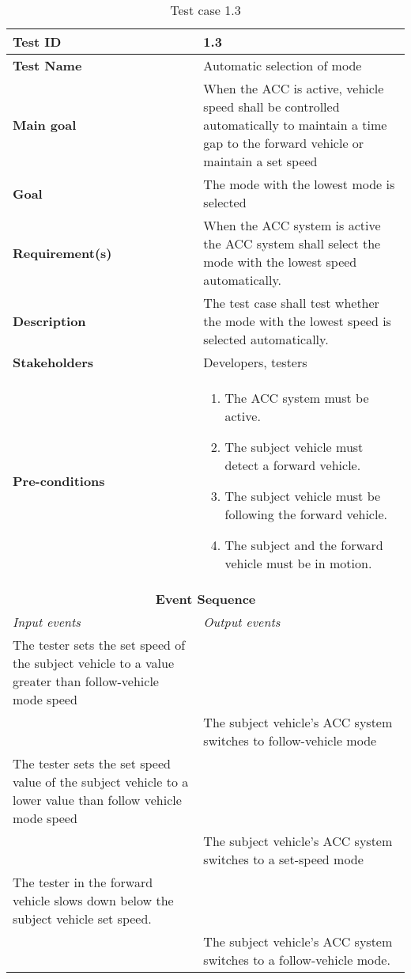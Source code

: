 \begin{table}[H]
\centering
\begin{tabularx}{\linewidth}{X|X}
  \hline
  \textbf{Test ID} & 1.3 \\
  \hline
  \textbf{Test Name} & Automatic selection of mode \\
  \hline
  \textbf{Main goal} & When the ACC is active, vehicle speed shall be controlled automatically to maintain a time gap to the forward vehicle or maintain a set speed  \\
  \hline
  \textbf{Goal} & The mode with the lowest mode is selected \\
  \hline
  \textbf{Requirement(s)} & When the ACC system is active the ACC system shall select the mode with the lowest speed automatically. \\
  \hline
  \textbf{Description} & The test case shall test whether the mode with the lowest speed is selected automatically.  \\
  \hline
  \textbf{Stakeholders} & Developers, testers \\
  \hline
  \textbf{Pre-conditions} & 
  \begin{enumerate}
      \item The ACC system must be active.
      \item The subject vehicle must detect a forward vehicle.
      \item The subject vehicle must be following the forward vehicle.
      \item The subject and the forward vehicle must be in motion. 
  \end{enumerate}
  \\
  \hline
  \multicolumn{2}{c}{\textbf{Event Sequence}} \\
  \hline
  \textit{Input events} & \textit{Output events} \\
  \hline
   The tester sets the set speed of the subject vehicle to a value greater than follow-vehicle mode speed &  \\
  \hline
   &  The subject vehicle's ACC system switches to follow-vehicle mode \\
  \hline
   The tester sets the set speed value of the subject vehicle to a lower value than follow vehicle mode speed &  \\
  \hline
   &  The subject vehicle's ACC system switches to a set-speed mode \\
  \hline
  The tester in the forward vehicle slows down below the subject vehicle set speed. & \\
  \hline
   & The subject vehicle's ACC system switches to a follow-vehicle mode. \\
   \hline
  \end{tabularx}
\caption{\label{tab_case3} Test case 1.3}
\end{table}

